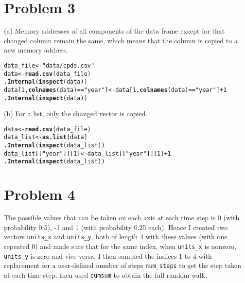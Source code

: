 \documentclass{article}\usepackage[]{graphicx}\usepackage[]{color}
\makeatletter
\newcommand{\hlnum}[1]{\textcolor[rgb]{0.686,0.059,0.569}{#1}}%
\newcommand{\hlstr}[1]{\textcolor[rgb]{0.192,0.494,0.8}{#1}}%
\newcommand{\hlopt}[1]{\textcolor[rgb]{0,0,0}{#1}}%
\newcommand{\hlstd}[1]{\textcolor[rgb]{0.345,0.345,0.345}{#1}}%
\newcommand{\hlkwb}[1]{\textcolor[rgb]{0.69,0.353,0.396}{#1}}%
\newcommand{\hlkwd}[1]{\textcolor[rgb]{0.737,0.353,0.396}{\textbf{#1}}}%
\newenvironment{kframe}{%
 \def\at@end@of@kframe{}%
 \ifinner\ifhmode%
  \def\at@end@of@kframe{\end{minipage}}%
  \begin{minipage}{\columnwidth}%
 \fi\fi%
 \def\FrameCommand##1{\hskip\@totalleftmargin \hskip-\fboxsep
 \colorbox{shadecolor}{##1}\hskip-\fboxsep
     \hskip-\linewidth \hskip-\@totalleftmargin \hskip\columnwidth}%
 \MakeFramed {\advance\hsize-\width
   \@totalleftmargin\z@ \linewidth\hsize
   \@setminipage}}%
 {\par\unskip\endMakeFramed%
 \at@end@of@kframe}
\newenvironment{knitrout}{}{} %
\makeatother
\begin{document}
\section{Problem 3}
(a) Memory addresses of all components of the data frame except for that changed column remain the same, which means that the column is copied to a new memory address.
\begin{knitrout}
\color{fgcolor}\begin{kframe}
\begin{alltt}
\hlstd{data_file} \hlkwb{<-} \hlstr{"data/cpds.csv"}
\hlstd{data} \hlkwb{<-} \hlkwd{read.csv}\hlstd{(data_file)}
\hlkwd{.Internal}\hlstd{(}\hlkwd{inspect}\hlstd{(data))}
\hlstd{data[}\hlnum{1}\hlstd{,} \hlkwd{colnames}\hlstd{(data)} \hlopt{==} \hlstr{"year"}\hlstd{]} \hlkwb{<-} \hlstd{data[}\hlnum{1}\hlstd{,} \hlkwd{colnames}\hlstd{(data)} \hlopt{==} \hlstr{"year"}\hlstd{]} \hlopt{+} \hlnum{1}
\hlkwd{.Internal}\hlstd{(}\hlkwd{inspect}\hlstd{(data))}
\end{alltt}
\end{kframe}
\end{knitrout}

(b) For a list, only the changed vector is copied.
\begin{knitrout}
\color{fgcolor}\begin{kframe}
\begin{alltt}
\hlstd{data} \hlkwb{<-} \hlkwd{read.csv}\hlstd{(data_file)}
\hlstd{data_list} \hlkwb{<-} \hlkwd{as.list}\hlstd{(data)}
\hlkwd{.Internal}\hlstd{(}\hlkwd{inspect}\hlstd{(data_list))}
\hlstd{data_list[[}\hlstr{"year"}\hlstd{]][}\hlnum{1}\hlstd{]} \hlkwb{<-} \hlstd{data_list[[}\hlstr{"year"}\hlstd{]][}\hlnum{1}\hlstd{]} \hlopt{+} \hlnum{1}
\hlkwd{.Internal}\hlstd{(}\hlkwd{inspect}\hlstd{(data_list))}
\end{alltt}
\end{kframe}
\end{knitrout}
\section{Problem 4}
The possible values that can be taken on each axis at each time step is 0 (with probability 0.5), -1 and 1 (with probability 0.25 each). 
Hence I created two vectors \texttt{units\_x} and \texttt{units\_y}, both of length 4 with these values (with one repeated 0) and made sure that for the same index, when \texttt{units\_x} is nonzero, \texttt{units\_y} is zero and vice versa. I then sampled the indices 1 to 4 with replacement for a user-defined number of steps \texttt{num\_steps} to get the step taken at each time step, then used \texttt{cumsum} to obtain the full random walk.
\end{document}
